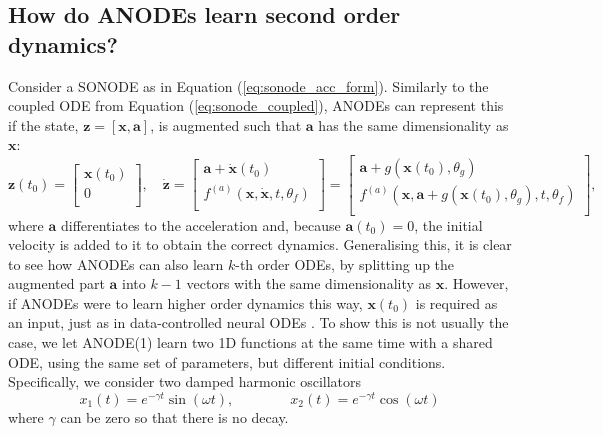 \documentclass{article}
\theoremstyle{remark}
\theoremstyle{definition}
\begin{document}
\subsection{How do ANODEs learn second order dynamics?}
\label{sec: how_anodes_learn_2nd}
Consider a SONODE as in Equation (\ref{eq:sonode_acc_form}). Similarly to the coupled ODE from Equation (\ref{eq:sonode_coupled}), ANODEs can represent this if the state, $\mathbf{z} = [\mathbf{x},\mathbf{a}]$, is augmented such that $\mathbf{a}$ has the same dimensionality as $\mathbf{x}$:
\begin{equation}
\label{eqn: anode_learn_2nd_order}
\mathbf{z}(t_{0}) = \begin{bmatrix}
    \mathbf{x}(t_{0})\\
    0\\
\end{bmatrix},
\quad
\dot{\mathbf{z}}
=
\begin{bmatrix}
    \mathbf{a} + \dot{\mathbf{x}}(t_{0})\\
    f^{(a)}(\mathbf{x}, \dot{\mathbf{x}}, t, \theta_{f})\\
\end{bmatrix}
=
\begin{bmatrix}
    \mathbf{a} + g(\mathbf{x}(t_{0}), \theta_{g})\\
    f^{(a)}(\mathbf{x}, \mathbf{a}+g(\mathbf{x}(t_{0}),\theta_{g}), t, \theta_{f})\\
\end{bmatrix},
\end{equation}
where $\mathbf{a}$ differentiates to the acceleration and, because $\mathbf{a}(t_{0})=0$, the initial velocity is added to it to obtain the correct dynamics. Generalising this, it is clear to see how ANODEs can also learn $k$-th order ODEs, by splitting up the augmented part $\mathbf{a}$ into $k-1$ vectors with the same dimensionality as $\mathbf{x}$. However, if ANODEs were to learn higher order dynamics this way, $\mathbf{x}(t_{0})$ is required as an input, just as in data-controlled neural ODEs \cite{massaroli2020dissecting}. To show this is not usually the case, we let ANODE(1) learn two 1D functions at the same time with a shared ODE, using the same set of parameters, but different initial conditions. Specifically, we consider two damped harmonic oscillators
\begin{equation}
x_{1}(t) = e^{-\gamma t}\sin(\omega t),
\qquad
\qquad
x_{2}(t) = e^{-\gamma t}\cos(\omega t)
\end{equation}
where $\gamma$ can be zero so that there is no decay. 
\end{document}
